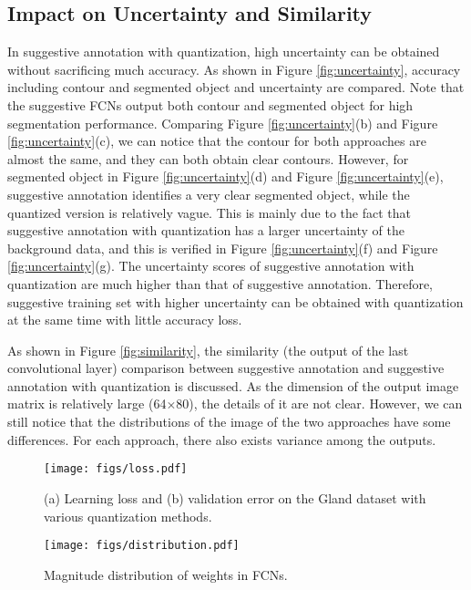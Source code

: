 \documentclass[10pt,twocolumn,letterpaper]{article}
\begin{document}
\subsection{Impact on Uncertainty and Similarity}\label{samples}
In suggestive annotation with quantization, high uncertainty can be obtained without sacrificing much accuracy.
As shown in Figure \ref{fig:uncertainty}, accuracy including contour and segmented object and uncertainty are compared.
Note that the suggestive FCNs output both contour and segmented object for high segmentation performance.
Comparing Figure \ref{fig:uncertainty}(b) and Figure \ref{fig:uncertainty}(c), we can notice that the contour for both approaches are almost the same, and they can both obtain clear contours.
However, for segmented object in Figure \ref{fig:uncertainty}(d) and Figure \ref{fig:uncertainty}(e), suggestive annotation identifies a very clear segmented object, while the quantized version is relatively vague.
This is mainly due to the fact that suggestive annotation with quantization has a larger uncertainty of the background data, and this is verified in Figure \ref{fig:uncertainty}(f) and Figure \ref{fig:uncertainty}(g).
The uncertainty scores of suggestive annotation with quantization are much higher than that of suggestive annotation.
Therefore, suggestive training set with higher uncertainty can be obtained with quantization at the same time with little accuracy loss.




As shown in Figure \ref{fig:similarity}, the similarity (the output of the last convolutional layer) comparison between suggestive annotation and suggestive annotation with quantization is discussed.
As the dimension of the output image matrix is relatively large (64$\times$80), the details of it are not clear.
However, we can still notice that the distributions of the image of the two approaches have some differences.
For each approach, there also exists variance among the outputs.




\begin{figure}%
\begin{center}
\centerline{\texttt{[image: figs/loss.pdf]}}
\end{center}
\vspace{-20pt}
   \caption{(a) Learning loss and (b) validation error on the Gland dataset with various quantization methods.}
\label{fig:loss}

\end{figure}
\begin{figure}%
\begin{center}
\centerline{\texttt{[image: figs/distribution.pdf]}}
\end{center}
\vspace{-20pt}
   \caption{Magnitude distribution of weights in FCNs.}
\label{fig:distribution}
\end{figure}
\end{document}
